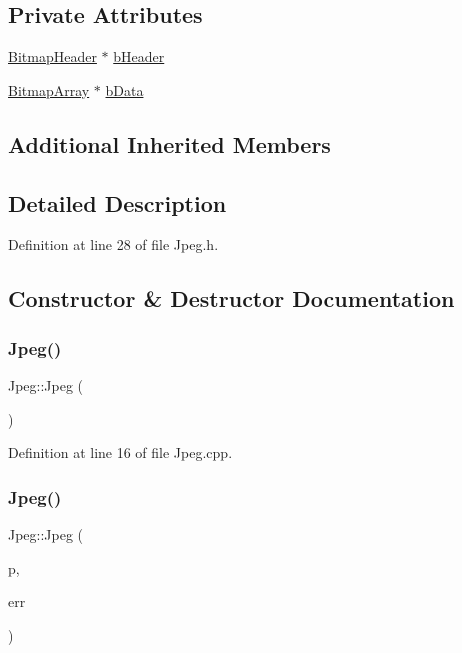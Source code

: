\subsection*{Private Attributes}
\begin{DoxyCompactItemize}
\item 
\mbox{\hyperlink{classBitmapHeader}{Bitmap\+Header}} $\ast$ \mbox{\hyperlink{classJpeg_aa082665a8e0eedfbb78e0a828198c0a0}{b\+Header}}
\item 
\mbox{\hyperlink{classBitmapArray}{Bitmap\+Array}} $\ast$ \mbox{\hyperlink{classJpeg_a3ea01fc26477aac0dbed3514e8f82874}{b\+Data}}
\end{DoxyCompactItemize}
\subsection*{Additional Inherited Members}


\subsection{Detailed Description}


Definition at line 28 of file Jpeg.\+h.



\subsection{Constructor \& Destructor Documentation}
\mbox{\label{classJpeg_aa6712899740d8d3d8789efe83aeeffac}} 
\subsubsection{\texorpdfstring{Jpeg()}{Jpeg()}\hspace{0.1cm}{\footnotesize\ttfamily [1/3]}}
{\footnotesize\ttfamily Jpeg\+::\+Jpeg (\begin{DoxyParamCaption}{ }\end{DoxyParamCaption})}



Definition at line 16 of file Jpeg.\+cpp.

\mbox{\label{classJpeg_a8c226ee5074c5058b96b918b99e4a531}} 
\subsubsection{\texorpdfstring{Jpeg()}{Jpeg()}\hspace{0.1cm}{\footnotesize\ttfamily [2/3]}}
{\footnotesize\ttfamily Jpeg\+::\+Jpeg (\begin{DoxyParamCaption}\item[{std\+::string}]{p,  }\item[{\mbox{\hyperlink{classErrorHandler}{Error\+Handler}} $\ast$}]{err }\end{DoxyParamCaption})}



